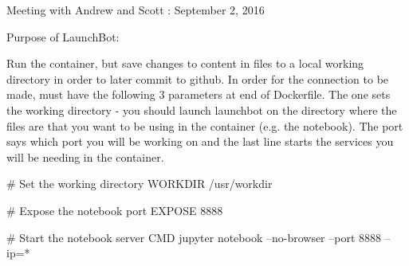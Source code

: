 Meeting with Andrew and Scott : September 2, 2016

Purpose of LaunchBot:

Run the container, but save changes to content in files to a local working directory in order to later commit to github. In order for the connection to be made, must have the following 3 parameters at end of Dockerfile. The one sets the working directory - you should launch launchbot on the directory where the files are that you want to be using in the container (e.g. the notebook). The port says which port you will be working on and the last line starts the services you will be needing in the container.

# Set the working directory
WORKDIR /usr/workdir

# Expose the notebook port
EXPOSE 8888

# Start the notebook server
CMD jupyter notebook --no-browser --port 8888 --ip=*

